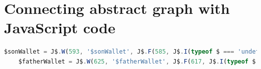 \section{Connecting abstract graph with JavaScript code}
	
	\begin{lstlisting}[language=JavaScript, caption={Example of RxJS code.},label={lst:Instrumented}]
	$sonWallet = J$.W(593, '$sonWallet', J$.F(585, J$.I(typeof $ === 'undefined' ? $ = J$.R(569, '$', undefined, true, true) : $ = J$.R(569, '$', $, true, true)), false)(J$.T(577, '#wallet-son', 21, false)), J$.I(typeof $sonWallet === 'undefined' ? undefined : $sonWallet), true, true);
	$fatherWallet = J$.W(625, '$fatherWallet', J$.F(617, J$.I(typeof $ === 'undefined' ? $ = J$.R(601, '$', undefined, true, true) : $ = J$.R(601, '$', $, true, true)), false)(J$.T(609, '#wallet-father', 21, false)), J$.I(typeof $fatherWallet === 'undefined' ? undefined : $fatherWallet), true, true);
	\end{lstlisting}
	
